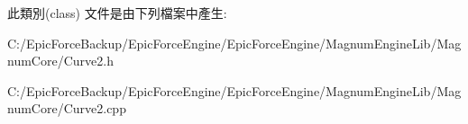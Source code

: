 此類別(class) 文件是由下列檔案中產生\+:\begin{DoxyCompactItemize}
\item 
C\+:/\+Epic\+Force\+Backup/\+Epic\+Force\+Engine/\+Epic\+Force\+Engine/\+Magnum\+Engine\+Lib/\+Magnum\+Core/Curve2.\+h\item 
C\+:/\+Epic\+Force\+Backup/\+Epic\+Force\+Engine/\+Epic\+Force\+Engine/\+Magnum\+Engine\+Lib/\+Magnum\+Core/Curve2.\+cpp\end{DoxyCompactItemize}
